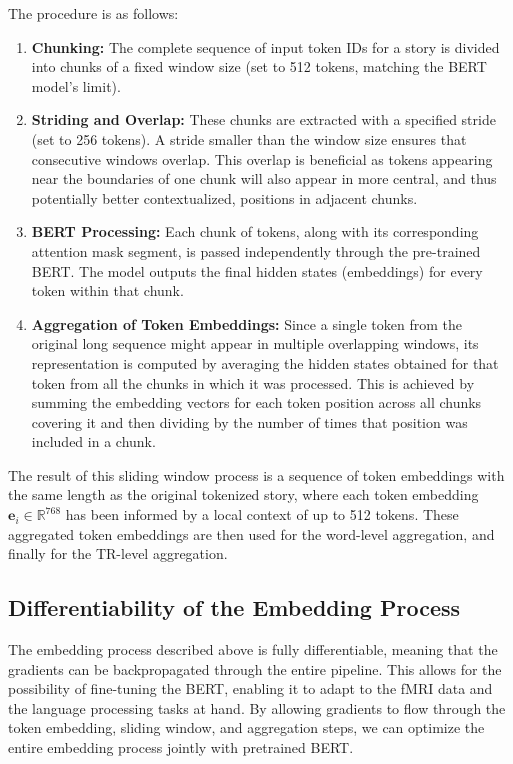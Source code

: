 \documentclass[10pt,letterpaper]{article}
\begin{document}
The procedure is as follows:
\begin{enumerate}
    \item \textbf{Chunking:} The complete sequence of input token IDs for a story is divided into chunks of a fixed window size (set to 512 tokens, matching the BERT model's limit).
    \item \textbf{Striding and Overlap:} These chunks are extracted with a specified stride (set to 256 tokens). A stride smaller than the window size ensures that consecutive windows overlap. This overlap is beneficial as tokens appearing near the boundaries of one chunk will also appear in more central, and thus potentially better contextualized, positions in adjacent chunks.
    \item \textbf{BERT Processing:} Each chunk of tokens, along with its corresponding attention mask segment, is passed independently through the pre-trained BERT. The model outputs the final hidden states (embeddings) for every token within that chunk.
    \item \textbf{Aggregation of Token Embeddings:} Since a single token from the original long sequence might appear in multiple overlapping windows, its representation is computed by averaging the hidden states obtained for that token from all the chunks in which it was processed. This is achieved by summing the embedding vectors for each token position across all chunks covering it and then dividing by the number of times that position was included in a chunk.
\end{enumerate}
The result of this sliding window process is a sequence of token embeddings with the same length as the original tokenized story, where each token embedding \( \mathbf{e}_i \in \mathbb{R}^{768} \) has been informed by a local context of up to 512 tokens. These aggregated token embeddings are then used for the word-level aggregation, and finally for the TR-level aggregation.

\subsection{Differentiability of the Embedding Process}
The embedding process described above is fully differentiable, meaning that the gradients can be backpropagated through the entire pipeline. This allows for the possibility of fine-tuning the BERT, enabling it to adapt to the fMRI data and the language processing tasks at hand. By allowing gradients to flow through the token embedding, sliding window, and aggregation steps, we can optimize the entire embedding process jointly with pretrained BERT.
\end{document}
